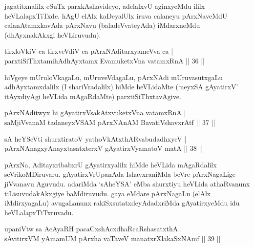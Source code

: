 \begin{artha} 
jagatitxnalilx eSuTx parxkAshavideyo, adelalxvU aginxyeMdu ililx 
heVLalapxTiTxde. hAgU elAlx kaDeyalUlx iruva calaneyu pArxNaveMdU 
calanAtamxkavAda pArxNavu (baladeVvateyAda) iMdarxneMdu (dhAyxnakAkxgi 
heVLiruvudu).
\end{artha}


\begin{shl}
tirxloVkiV ca tirxveVdiV ca pArxNAditarxyameVva ca | \\
parxtiSiThxtamihAdhAyxtamx EvamuketxVna vatamxRnA \hfill ||  36 || 
\end{shl}

\begin{artha} 
hiVgeye mUruloVkagaLu, mUruveVdagaLu, pArxNAdi mUruvasutxgaLu 
adhAyxtamxdalilx (I shariVradalilx) hiMde heVLidaMte (`neyxSA 
gAyatirxV' itAyxdiyAgi heVLida mAgaRdaMte) parxtiSiThxtavAgive.
\end{artha}

\begin{shl}
pArxNAditwyx hi gAyatirxVsakAtxvuketxVna vatamxRnA | \\
saMjiVvanaM tadaneyxVSAM pArxNAnAM BavatiVshavxrAtf \hfill ||  37 || 
\end{shl}

\begin{shl}
sA heYSeVti shurxtiratoV yathoVkAtxthARvabudadhxyeV  | \\
pArxNAnagxyAnayxtasatxterxV gAyatirxVyamatoV matA \hfill ||  38 || 
\end{shl}

\begin{artha} 
pArxNa, AditayxribabxrU gAyatirxyalilx hiMde heVLida mAgaRdalilx 
seVrikoMDiruvaru. gAyatirxVrUpanAda IshavxraniMda beVre pArxNagaLige 
jiVvanavu Aguvudu. adariMda `sAheYSA' eMba shurxtiyu heVLida 
athaRvanunx tiLisuvudakAkxgiye baMdiruvudu. gaya eMdare pArxNagaLu 
(elAlx iMdirxyagaLu) avugaLanunx rakiSxsutatxdeyAdadxriMda 
gAyatirxyeMdu idu heVLalapxTiTxruvadu.
\end{artha}


\begin{shl}
upaniVtw sa AcAyaRH pacaCxshAcxdhaRcaRshasatxthA | \\
sAvitirxVM yAmamUM pArxha vaTaveV manatxrXlakaSxNAmf \hfill ||  39 ||
\end{shl}

